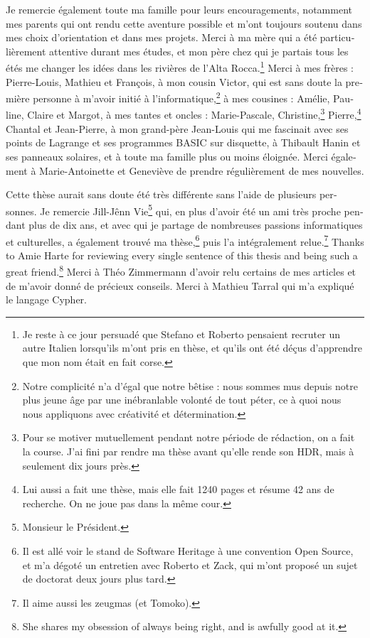 \begin{otherlanguage}{french}
\begin{SingleSpace}
  Je remercie également toute ma famille pour leurs encouragements, notamment
  mes parents qui ont rendu cette aventure possible et m'ont toujours soutenu
  dans mes choix d'orientation et dans mes projets. Merci à ma mère qui a été
  particulièrement attentive durant mes études, et mon père chez qui je partais
  tous les étés me changer les idées dans les rivières de l'Alta
  Rocca.\footnote{Je reste à ce jour persuadé que Stefano et Roberto pensaient
  recruter un autre Italien lorsqu'ils m'ont pris en thèse, et qu'ils ont été
  déçus d'apprendre que mon nom était en fait corse.}
  Merci à mes frères : Pierre-Louis, Mathieu et François,
  à mon cousin Victor,
  qui est sans doute la première personne à m'avoir initié à
  l'informatique,\footnote{Notre complicité n'a d'égal que notre bêtise : nous
  sommes mus depuis notre plus jeune âge par une inébranlable volonté de tout
  péter, ce à quoi nous nous appliquons avec créativité et détermination.}
  à mes cousines : Amélie, Pauline, Claire et Margot,
  à mes tantes et oncles : Marie-Pascale, Christine,\footnote{Pour
  se motiver mutuellement pendant notre période de rédaction, on a fait la
  course. J'ai fini par rendre ma thèse avant qu'elle rende son HDR, mais à
  seulement dix jours près.}
  Pierre,\footnote{Lui aussi a fait une thèse, mais elle fait 1240
  pages et résume 42 ans de recherche. On ne joue pas dans la même cour.}
  Chantal et Jean-Pierre, à mon grand-père Jean-Louis qui me fascinait
  avec ses points de Lagrange et ses programmes BASIC sur disquette, à Thibault
  Hanin et ses panneaux solaires, et à toute ma famille plus ou moins éloignée.
  Merci également à Marie-Antoinette et Geneviève de prendre régulièrement de
  mes nouvelles.

  Cette thèse aurait sans doute été très différente sans l'aide de plusieurs
  personnes. Je remercie Jill-Jênn Vie\footnote{Monsieur le Président.} qui, en
  plus d'avoir été un ami très proche pendant plus de dix ans, et avec qui je
  partage de nombreuses passions informatiques et culturelles, a également
  trouvé ma thèse,\footnote{Il est allé voir le stand de Software Heritage à
  une convention Open Source, et m'a dégoté un entretien avec Roberto et Zack,
  qui m'ont proposé un sujet de doctorat deux jours plus tard.} puis l'a
  intégralement relue.\footnote{Il aime aussi les zeugmas (et Tomoko).}
  Thanks to Amie Harte for reviewing every single sentence of this thesis and
  being such a great friend.\footnote{She shares my obsession of always being
  right, and is awfully good at it.} Merci à Théo Zimmermann d'avoir relu
  certains de mes articles et de m'avoir donné de précieux conseils. Merci à
  Mathieu Tarral qui m'a expliqué le langage Cypher.


\end{SingleSpace}
\end{otherlanguage}
